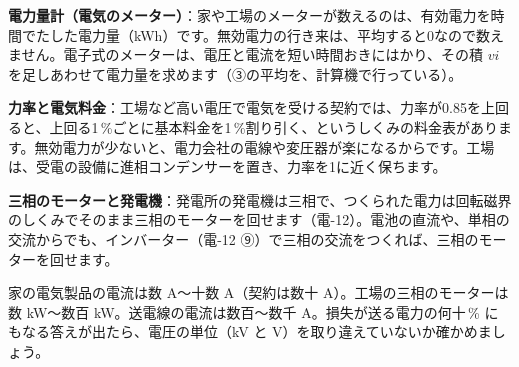 \begin{phkougaku}
\textbf{電力量計（電気のメーター）}：家や工場のメーターが数えるのは、有効電力を時間でたした電力量（kWh）です。無効電力の行き来は、平均すると0なので数えません。電子式のメーターは、電圧と電流を短い時間おきにはかり、その積 $vi$ を足しあわせて電力量を求めます（③の平均を、計算機で行っている）。

\textbf{力率と電気料金}：工場など高い電圧で電気を受ける契約では、力率が0.85を上回ると、上回る1\,\%ごとに基本料金を1\,\%割り引く、というしくみの料金表があります。無効電力が少ないと、電力会社の電線や変圧器が楽になるからです。工場は、受電の設備に進相コンデンサーを置き、力率を1に近く保ちます。

\textbf{三相のモーターと発電機}：発電所の発電機は三相で、つくられた電力は回転磁界のしくみでそのまま三相のモーターを回せます（電-12）。電池の直流や、単相の交流からでも、インバーター（電-12 ⑨）で三相の交流をつくれば、三相のモーターを回せます。

\begin{phketa}[電圧と電力の数の目安]
家の電気製品の電流は数 A〜十数 A（契約は数十 A）。工場の三相のモーターは数 kW〜数百 kW。送電線の電流は数百〜数千 A。損失が送る電力の何十\,\% にもなる答えが出たら、電圧の単位（kV と V）を取り違えていないか確かめましょう。
\end{phketa}
\end{phkougaku}

